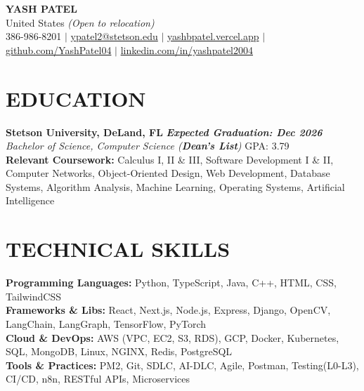 \documentclass[letterpaper,10pt]{article}
\begin{document}
\begin{center}
     {\LARGE \textbf{YASH PATEL}} \\[4pt]
    United States \textit{(Open to relocation)} \\[4pt] 386-986-8201 $|$ 
    \href{mailto:ypatel2@stetson.edu}{ypatel2@stetson.edu} $|$ 
    \href{https://yashbpatel.vercel.app}{yashbpatel.vercel.app} $|$ 
    \href{https://github.com/YashPatel04}{github.com/YashPatel04} $|$ 
    \href{https://linkedin.com/in/yashpatel2004}{linkedin.com/in/yashpatel2004}
\end{center}
\section*{EDUCATION}
\textbf{Stetson University, DeLand, FL} \hfill \textbf{\textit{Expected Graduation: Dec 2026}} \\
\textit{Bachelor of Science, Computer Science (\textbf{Dean's List})} \hfill GPA: 3.79 \\
\textbf{Relevant Coursework:} Calculus I, II \& III, Software Development I \& II, Computer Networks, Object-Oriented Design, Web Development, Database Systems, Algorithm Analysis, Machine Learning, Operating Systems, Artificial Intelligence
\section*{TECHNICAL SKILLS}
\textbf{Programming Languages:} Python, TypeScript, Java, C++, HTML, CSS, TailwindCSS \\
\textbf{Frameworks \& Libs:} React, Next.js, Node.js, Express, Django, OpenCV, LangChain, LangGraph, TensorFlow, PyTorch\\
\textbf{Cloud \& DevOps:} AWS (VPC, EC2, S3, RDS), GCP, Docker, Kubernetes, SQL, MongoDB, Linux, NGINX, Redis, PostgreSQL \\
\textbf{Tools \& Practices:} PM2, Git, SDLC, AI-DLC, Agile, Postman, Testing(L0-L3), CI/CD, n8n, RESTful APIs, Microservices
\end{document}
